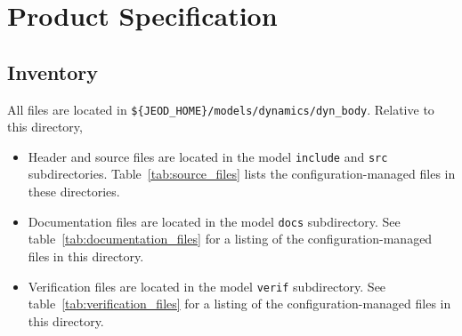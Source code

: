\chapter{Product Specification}\label{ch:spec}




\clearpage


\clearpage


\clearpage


\clearpage
\section{Inventory}
All \ModelDesc files are located in
{\tt \$\{JEOD\_HOME\}/models/dynamics/dyn\_body}.
Relative to this directory,
\begin{itemize}
\vspace{-0.2\baselineskip}
\item Header and source files are located
in the model {\tt include} and {\tt src} subdirectories.
Table~\ref{tab:source_files} lists the
configuration-managed files in these directories.
\vspace{-0.1\baselineskip}
\item Documentation files are located in the model {\tt docs} subdirectory.
See table~\ref{tab:documentation_files}
for a listing of the
configuration-managed files in this directory.
\vspace{-0.1\baselineskip}
\item Verification files are located in the model {\tt verif} subdirectory.
See table~\ref{tab:verification_files}
for a listing of the
configuration-managed files in this directory.
\end{itemize}



